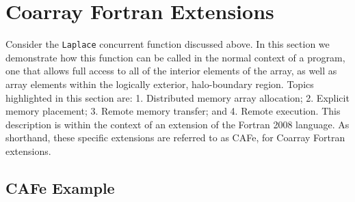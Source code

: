 \section{Coarray Fortran Extensions}


Consider the \texttt{Laplace} concurrent function discussed above.  In
this section we demonstrate how this function can be called in the
normal context of a program, one that allows full access to all of the
interior elements of the array, as well as array elements within the
logically exterior, halo-boundary region.  Topics highlighted in this
section are: 1. Distributed memory array allocation; 2. Explicit
memory placement; 3. Remote memory transfer; and 4. Remote execution.
This description is within the context of an extension of the Fortran
2008 language.  As shorthand, these specific extensions are referred
to as CAFe, for Coarray Fortran extensions.

\subsection{CAFe Example}

